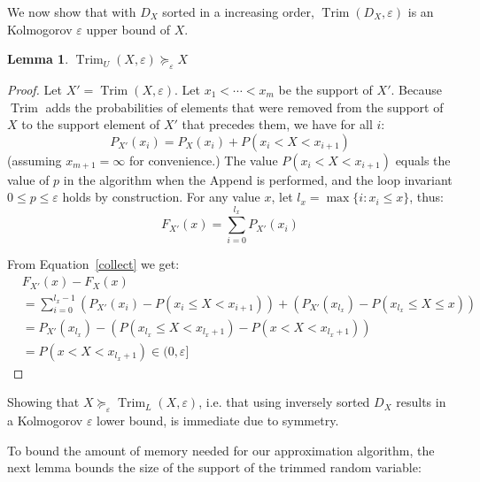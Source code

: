 \documentclass[review]{elsarticle}
\newtheorem{lemma}{Lemma}
\DeclareMathOperator{\Trim}{Trim}
\begin{document}
%

\noindent We now show that with $D_X$ sorted in a increasing order,
$\Trim(D_X,\varepsilon)$ is an Kolmogorov $\varepsilon$ upper bound of $X$.
\begin{lemma} \label{Trim}
$\Trim_U(X,\varepsilon)\succeq_\varepsilon X$
\end{lemma}

\begin{proof}
Let $X'=\Trim(X,\varepsilon)$. 
Let $x_1{<}\cdots{<}x_m$ be the support of $X'$. 
Because $\Trim$ adds the probabilities of elements that were removed from the support of $X$ 
to the support element of $X'$ that precedes them, 
we have for all $i$:
\begin{equation}
P_{X'}(x_i) = P_X(x_i) +  P(x_i < X < x_{i+1})
\label{collect}
\end{equation}
(assuming $x_{m+1} = \infty$ for convenience.)
The value $P(x_i < X < x_{i+1})$ equals the value of $p$ in
the algorithm when the Append is performed, and  the loop invariant $0 \leq p \leq \varepsilon$ holds by construction.
For any value $x$, let $l_x=\max\{ i \colon x_i\leq x\}$, thus:
\[
F_{X'}(x) = \sum_{i=0}^{l_x} P_{X'}(x_i)
\]

From Equation~\eqref{collect} we get:
{
\begin{align*}
&F_{X'}(x) - F_{X}(x)  \\
 &{=} \sum_{i=0}^{l_x-1} (P_{X'}(x_i)- P(x_i\leq X <x_{i+1})) +(P_{X'}(x_{l_x})-P(x_{l_x} \leq X \leq x)) \\%
&{=}P_{X'}(x_{l_x}) {-} (P(x_{l_x} {\leq} X {<} x_{l_x+1}) {-} P(x {<} X {<} x_{l_x+1})) \\
&{=}P(x < X < x_{l_x+1}) \in (0,\varepsilon]
\end{align*}}
\end{proof}
%
Showing that $X \succeq_\varepsilon \Trim_L(X,\varepsilon)$, i.e. that using inversely sorted $D_X$ results in a Kolmogorov $\varepsilon$ lower bound, is immediate due to symmetry.

To bound the amount of memory needed for our approximation algorithm,
the next lemma bounds the size of the support of the trimmed random variable:
\end{document}
